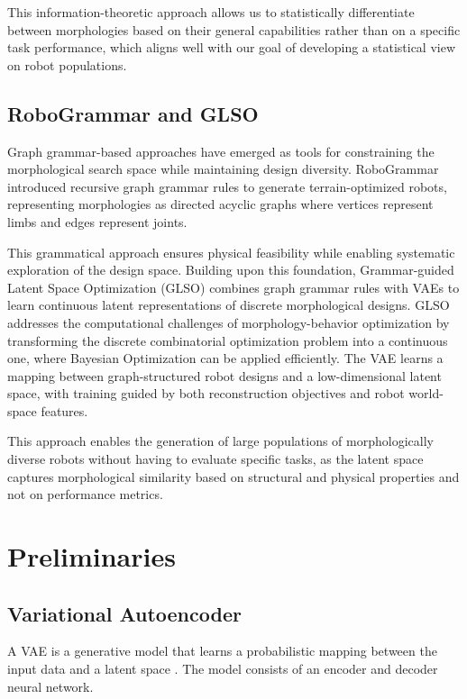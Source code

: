 \documentclass{article}
\theoremstyle{plain}
\theoremstyle{definition}
\theoremstyle{remark}
\begin{document}
This information-theoretic approach allows us to statistically differentiate between morphologies based on their general capabilities rather than on a specific task performance, which aligns well with our goal of developing a statistical view on robot populations.

\subsection{RoboGrammar and GLSO}

Graph grammar-based approaches have emerged as tools for constraining the morphological search space while maintaining design diversity. RoboGrammar \cite{zhao2020robogrammar} introduced recursive graph grammar rules to generate terrain-optimized robots, representing morphologies as directed acyclic graphs where vertices represent limbs and edges represent joints. 

This grammatical approach ensures physical feasibility while enabling systematic exploration of the design space. Building upon this foundation, Grammar-guided Latent Space Optimization (GLSO) \cite{hu2023glso} combines graph grammar rules with VAEs to learn continuous latent representations of discrete morphological designs. GLSO addresses the computational challenges of morphology-behavior optimization by transforming the discrete combinatorial optimization problem into a continuous one, where Bayesian Optimization can be applied efficiently. The VAE learns a mapping between graph-structured robot designs and a low-dimensional latent space, with training guided by both reconstruction objectives and robot world-space features. 

This approach enables the generation of large populations of morphologically diverse robots without having to evaluate specific tasks, as the latent space captures morphological similarity based on structural and physical properties and not on performance metrics.

\section{Preliminaries}
\subsection{Variational Autoencoder} \label{vae}
A VAE is a generative model that learns a probabilistic mapping between the input data and a latent space \cite{kingma2014auto}. The model consists of an encoder and decoder neural network. 
\end{document}
